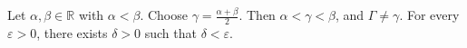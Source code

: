 Let $\alpha, \beta \in \mathbb{R}$ with $\alpha < \beta$.
Choose $\gamma = \frac{\alpha + \beta}{2}$.
Then $\alpha < \gamma < \beta$, and $\Gamma \neq \gamma$.
For every $\varepsilon > 0$, there exists $\delta > 0$ such that $\delta < \varepsilon$.